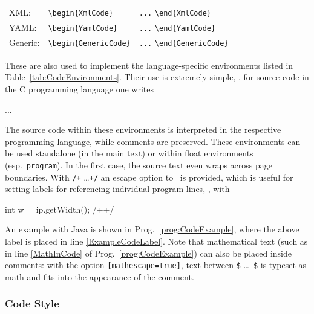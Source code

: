 \begin{table}
\begin{tabular}{@{}lll@{}}
        XML: & \verb!\begin{XmlCode}!
        & \verb!...! \verb!\end{XmlCode}! \\
        YAML: & \verb!\begin{YamlCode}!
        & \verb!...! \verb!\end{YamlCode}! \\
        Generic: & \verb!\begin{GenericCode}!
        & \verb!...! \verb!\end{GenericCode}! \\
        \bottomrule
    \end{tabular}
\end{table}

These are also used to implement the language-specific environments listed in
Table~\ref{tab:CodeEnvironments}. Their use is extremely simple, \eg, for
source code in the C programming language one writes
%
\begin{GenericCode}[numbers=none]
\begin{CCode}
    ... 
\end{CCode}
\end{GenericCode}
%
The source code within these environments is interpreted in the respective
programming language, while comments are preserved. These environments can be
used standalone (in the main text) or within float environments (esp.\
\texttt{program}). In the first case, the source text even wraps across page
boundaries. With \verb!/+! \ldots \verb!+/! an escape option to \latex\ is
provided, which is useful for setting labels for referencing individual
program lines, \eg, with
%
\begin{GenericCode}[numbers=none]
int w = ip.getWidth(); /+\label{ExampleCodeLabel}+/
\end{GenericCode}
%
An example with Java is shown in Prog.~\ref{prog:CodeExample}, where the
above label is placed in line \ref{ExampleCodeLabel}. Note that mathematical
text (such as in line \ref{MathInCode} of Prog.~\ref{prog:CodeExample}) can
also be placed inside comments: with the option \verb![mathescape=true]!, text
between \verb!$! \ldots\ \verb!$! is typeset as math and fits into the
appearance of the comment.


\subsubsection{Code Style}
\label{sec:CodeStyle}

